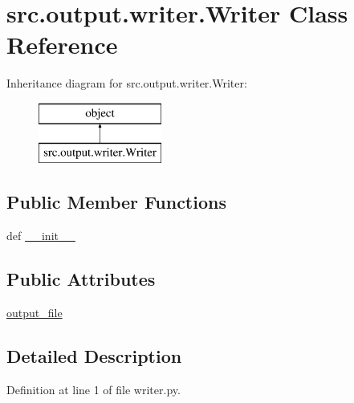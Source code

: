\hypertarget{classsrc_1_1output_1_1writer_1_1_writer}{\section{src.\+output.\+writer.\+Writer Class Reference}
\label{classsrc_1_1output_1_1writer_1_1_writer}
}
Inheritance diagram for src.\+output.\+writer.\+Writer\+:\begin{figure}[H]
\begin{center}
\leavevmode
\includegraphics[height=2.000000cm]{classsrc_1_1output_1_1writer_1_1_writer}
\end{center}
\end{figure}
\subsection*{Public Member Functions}
\begin{DoxyCompactItemize}
\item 
def \hyperlink{classsrc_1_1output_1_1writer_1_1_writer_a711a2698719ff275a4f0f59646667ce3}{\+\_\+\+\_\+init\+\_\+\+\_\+}
\end{DoxyCompactItemize}
\subsection*{Public Attributes}
\begin{DoxyCompactItemize}
\item 
\hyperlink{classsrc_1_1output_1_1writer_1_1_writer_ad504c4a077c503883153924963bca669}{output\+\_\+file}
\end{DoxyCompactItemize}


\subsection{Detailed Description}


Definition at line 1 of file writer.\+py.



